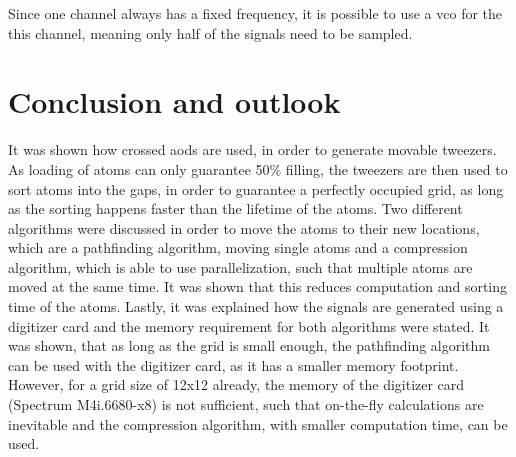Since one channel always has a fixed frequency, it is possible to use a \ac{vco} for the this channel, meaning only half of the signals need to be sampled.

\section{Conclusion and outlook}

It was shown how crossed \acp{aod} are used, in order to generate movable tweezers. As loading of atoms can only guarantee 50\% filling, the tweezers are then used to sort atoms into the gaps, in order to guarantee a perfectly occupied grid, as long as the sorting happens faster than the lifetime of the atoms. Two different algorithms were discussed in order to move the atoms to their new locations, which are a pathfinding algorithm, moving single atoms and a compression algorithm, which is able to use parallelization, such that multiple atoms are moved at the same time. It was shown that this reduces computation and sorting time of the atoms. Lastly, it was explained how the signals are generated using a digitizer card and the memory requirement for both algorithms were stated. It was shown, that as long as the grid is small enough, the pathfinding algorithm can be used with the digitizer card, as it has a smaller memory footprint. However, for a grid size of 12x12 already, the memory of the digitizer card (Spectrum M4i.6680-x8) is not sufficient, such that on-the-fly calculations are inevitable and the compression algorithm, with smaller computation time, can be used.
